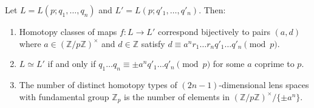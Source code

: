 Let $L = L(p; q_1, \dots, q_n)$ and $L' = L(p; q'_1, \dots, q'_n)$. Then:
\begin{enumerate}
\item[(A)] Homotopy classes of maps $f: L \to L'$ correspond bijectively to pairs $(a, d)$ where $a \in (\mathbb{Z}/p\mathbb{Z})^\times$ and $d \in \mathbb{Z}$ satisfy $d \equiv a^n r_1 \dots r_n q'_1 \dots q'_n \pmod{p}$.
\item[(B)] $L \simeq L'$ if and only if $q_1 \dots q_n \equiv \pm a^n q'_1 \dots q'_n \pmod{p}$ for some $a$ coprime to $p$.
\item[(C)] The number of distinct homotopy types of $(2n-1)$-dimensional lens spaces with fundamental group $\mathbb{Z}_p$ is the number of elements in $(\mathbb{Z}/p\mathbb{Z})^\times / \{\pm a^n\}$.
\end{enumerate}
